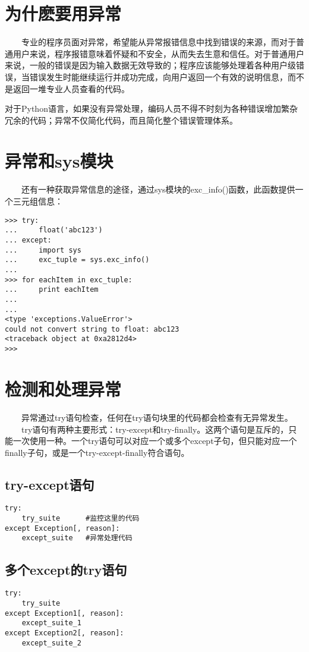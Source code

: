 \documentclass[11pt,a4paper]{article}
\begin{document}
\begin{CJK*}{UTF8}{nsung}
\section{为什麽要用异常}

~~~~专业的程序员面对异常，希望能从异常报错信息中找到错误的来源，而对于普通用户来说，程序报错意味着怀疑和不安全，从而失去生意和信任。对于普通用户来说，一般的错误是因为输入数据无效导致的；程序应该能够处理着各种用户级错误，当错误发生时能继续运行并成功完成，向用户返回一个有效的说明信息，而不是返回一堆专业人员查看的代码。\par

对于Python语言，如果没有异常处理，编码人员不得不时刻为各种错误增加繁杂冗余的代码；异常不仅简化代码，而且简化整个错误管理体系。

\section{异常和sys模块}
~~~~还有一种获取异常信息的途径，通过sys模块的exc\_info()函数，此函数提供一个三元组信息：
\begin{verbatim}
>>> try:
...     float('abc123')
... except:
...     import sys
...     exc_tuple = sys.exc_info()
... 
>>> for eachItem in exc_tuple:
...     print eachItem
...     
... 
<type 'exceptions.ValueError'>
could not convert string to float: abc123
<traceback object at 0xa2812d4>
>>>
\end{verbatim}

\section{检测和处理异常}

~~~~异常通过try语句检查，任何在try语句块里的代码都会检查有无异常发生。\\

~~~~try语句有两种主要形式：try-except和try-finally。这两个语句是互斥的，只能一次使用一种。一个try语句可以对应一个或多个except子句，但只能对应一个finally子句，或是一个try-except-finally符合语句。

\subsection{try-except语句}
\begin{verbatim}
try:
    try_suite      #监控这里的代码
except Exception[, reason]:
    except_suite   #异常处理代码
\end{verbatim}

\subsection{多个except的try语句}
\begin{verbatim}
try:
    try_suite        
except Exception1[, reason]:
    except_suite_1   
except Exception2[, reason]:
    except_suite_2
\end{verbatim}


\end{CJK*}
\end{document}
